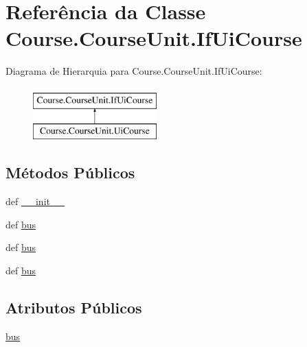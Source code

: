 \hypertarget{classCourse_1_1CourseUnit_1_1IfUiCourse}{\section{Referência da Classe Course.\-Course\-Unit.\-If\-Ui\-Course}
\label{classCourse_1_1CourseUnit_1_1IfUiCourse}
}
Diagrama de Hierarquia para Course.\-Course\-Unit.\-If\-Ui\-Course\-:\begin{figure}[H]
\begin{center}
\leavevmode
\includegraphics[height=2.000000cm]{d6/d82/classCourse_1_1CourseUnit_1_1IfUiCourse}
\end{center}
\end{figure}
\subsection*{Métodos Públicos}
\begin{DoxyCompactItemize}
\item 
def \hyperlink{classCourse_1_1CourseUnit_1_1IfUiCourse_a2520bf9924cf4f583820ad9fac468fe2}{\-\_\-\-\_\-init\-\_\-\-\_\-}
\item 
def \hyperlink{classCourse_1_1CourseUnit_1_1IfUiCourse_a6d3c42a9777fe9dd395d9390aef47903}{bus}
\item 
def \hyperlink{classCourse_1_1CourseUnit_1_1IfUiCourse_a6d3c42a9777fe9dd395d9390aef47903}{bus}
\item 
def \hyperlink{classCourse_1_1CourseUnit_1_1IfUiCourse_a6d3c42a9777fe9dd395d9390aef47903}{bus}
\end{DoxyCompactItemize}
\subsection*{Atributos Públicos}
\begin{DoxyCompactItemize}
\item 
\hyperlink{classCourse_1_1CourseUnit_1_1IfUiCourse_a228fc709b99da3a7e6f5020bd07cee03}{bus}
\end{DoxyCompactItemize}



